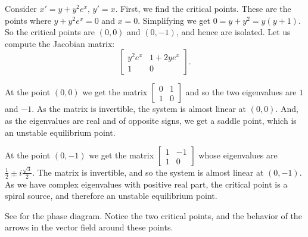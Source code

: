 \begin{example} \label{example:nlin-withexp}
Consider
$x'=y+y^2e^x$,
$y'=x$.  First, we find the critical points.  These are the points where
$y+y^2e^x = 0$ and $x=0$.  Simplifying we get $0=y+y^2 = y(y+1)$.  So the
critical points are $(0,0)$ and $(0,-1)$, and hence are isolated.  Let us
compute the Jacobian matrix:
\begin{equation*}
\begin{bmatrix}
y^2e^x & 1+2ye^x \\
1 & 0
\end{bmatrix}.
\end{equation*}

At the point $(0,0)$ we get the matrix
$\left[ \begin{smallmatrix} 0 & 1 \\ 1 & 0 \end{smallmatrix} \right]$ and
so the two eigenvalues are $1$ and $-1$.  As the matrix is invertible, the system is almost linear
at $(0,0)$.  And, as the eigenvalues are real
and of opposite signs, we get a saddle point, which is an unstable
equilibrium point.

At the point $(0,-1)$ we get the matrix
$\left[ \begin{smallmatrix} 1 & -1 \\ 1 & 0 \end{smallmatrix} \right]$ whose
eigenvalues are $\frac{1}{2} \pm i \frac{\sqrt{3}}{2}$.
The matrix is invertible, and so the system is almost linear at $(0,-1)$.
As we have complex eigenvalues with positive real part, the critical
point is a spiral source, and therefore an unstable equilibrium point.

\begin{myfig}
\capstart
{}
\caption{The phase portrait with few sample trajectories of 
$x'=y+y^2e^x$, $y'=x$.  \label{fig:nlin-ex813}}
\end{myfig}

See  for the phase diagram.  Notice the two
critical points, and the behavior of the arrows in the vector field around
these points.
\end{example}

